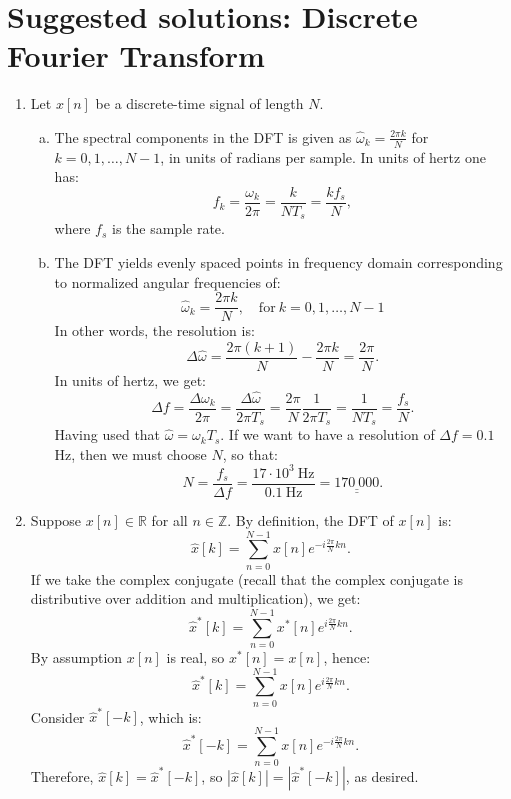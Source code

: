
\newpage
\section{Suggested solutions: Discrete Fourier Transform}

\begin{enumerate}
  \item Let $x[n]$ be a discrete-time signal of length $N$.

        \begin{enumerate}[a)]
          \item The spectral components in the DFT is given as $\hat{\omega}_{k}=\frac{2\pi k}{N}$ for $k=0,1,\hdots, N - 1$,
                in units of radians per sample. In units of hertz one has:
                \[ f_{k}=\frac{\omega_k}{2\pi}=\frac{k}{NT_{s}}=\frac{kf_{s}}{N}, \]
                where $f_{s}$ is the sample rate.

          \item The DFT yields evenly spaced points in frequency domain corresponding to normalized angular frequencies of:
                \[ \hat{\omega}_{k}=\frac{2\pi k}{N}, \quad \mathrm{for}\ k = 0, 1, \hdots, N - 1 \]
                In other words, the resolution is:
                \[ \Delta\hat{\omega}=\frac{2\pi (k+1)}{N}-\frac{2\pi k}{N}=\frac{2\pi}{N}. \]
                In units of hertz, we get:
                \[ \Delta f = \frac{\Delta\omega_{k}}{2\pi}=\frac{\Delta\hat{\omega}}{2\pi T_{s}}=\frac{2\pi}{N}\frac{1}{2\pi T_{s}}=\frac{1}{N T_{s}}=\frac{f_{s}}{N}. \]
                Having used that $\hat{\omega}=\omega_{k}T_{s}$. If we want to have a resolution of $\Delta f=0.1$ Hz, then we must choose $N$, so that:
                \[ N=\frac{f_{s}}{\Delta f}=\frac{17\cdot 10^{3}\ \mathrm{Hz}}{0.1\ \mathrm{Hz}}=\underline{\underline{170\ 000}}. \]
        \end{enumerate}

  \item Suppose $x[n]\in\mathbb{R}$ for all $n\in\mathbb{Z}$. By definition, the DFT of $x[n]$ is:
        \[ \hat{x}[k] = \sum_{n = 0}^{N - 1}x[n]e^{-i\frac{2\pi}{N}kn}. \]
        If we take the complex conjugate (recall that the complex conjugate is distributive 
        over addition and multiplication), we get:
        \[ \hat{x}^{*}[k] = \sum_{n = 0}^{N - 1}x^{*}[n]e^{i\frac{2\pi}{N}kn}. \]
        By assumption $x[n]$ is real, so $x^{*}[n] = x[n]$, hence:
        \[ \hat{x}^{*}[k] = \sum_{n = 0}^{N - 1}x[n]e^{i\frac{2\pi}{N}kn}. \]
        Consider $\hat{x}^{*}[-k]$, which is:
        \[ \hat{x}^{*}[-k] = \sum_{n = 0}^{N - 1}x[n]e^{-i\frac{2\pi}{N}kn}. \]
        Therefore, $\hat{x}[k] = \hat{x}^{*}[-k]$, so $|\hat{x}[k]| = |\hat{x}^{*}[-k]|$, as desired.


\end{enumerate}
